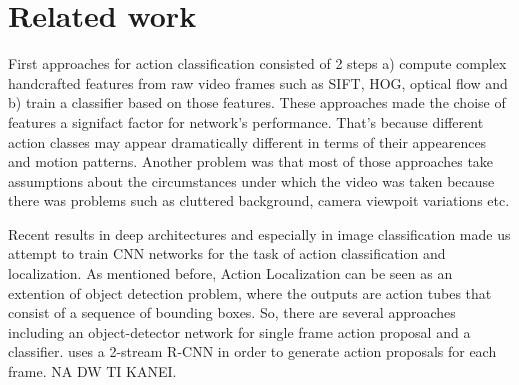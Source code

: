 \documentclass{report}
\begin{document}
\chapter{Related work}




First approaches for action classification consisted of 2 steps a) compute complex handcrafted features from raw video frames
such as SIFT, HOG, optical flow and b) train a classifier based on those features. These approaches made the choise of
features a signifact factor for network's performance. That's because different action classes may appear dramatically
different in terms of their appearences and motion patterns. Another problem was that most of those approaches take
assumptions about the circumstances under which the video was taken because there was problems such as cluttered
background, camera viewpoit variations etc.

Recent results in deep architectures and especially in image classification made us attempt to train CNN networks for
the task of action classification and localization. As mentioned before, Action Localization can be seen as an extention
of object detection problem, where the outputs are action tubes that consist of a sequence of bounding boxes. So, there
are several approaches including an object-detector network for single frame action proposal and a classifier.
\cite{DBLP:journals/corr/GkioxariM14} uses a 2-stream R-CNN \cite{DBLP:journals/corr/GirshickDDM13} in order to generate
action proposals for each frame.  \cite{peng:hal-01349107} NA DW TI KANEI.
\end{document}
